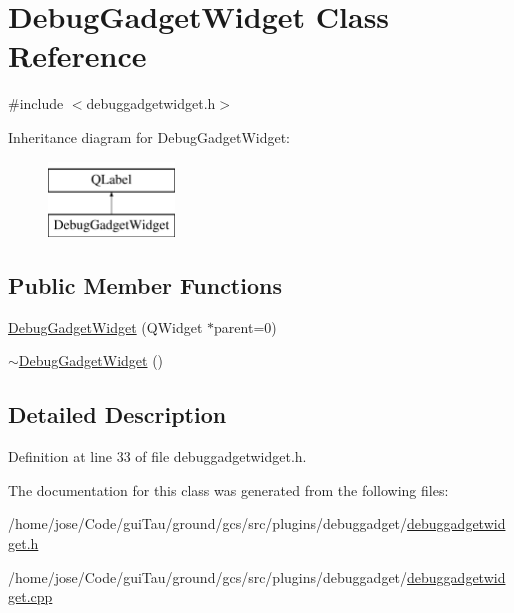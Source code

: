 \hypertarget{class_debug_gadget_widget}{\section{Debug\-Gadget\-Widget Class Reference}
\label{class_debug_gadget_widget}
}


{\ttfamily \#include $<$debuggadgetwidget.\-h$>$}

Inheritance diagram for Debug\-Gadget\-Widget\-:\begin{figure}[H]
\begin{center}
\leavevmode
\includegraphics[height=2.000000cm]{class_debug_gadget_widget}
\end{center}
\end{figure}
\subsection*{Public Member Functions}
\begin{DoxyCompactItemize}
\item 
\hyperlink{group___debug_gadget_plugin_ga67e29acbc33b5ca194215ea1c70e9e72}{Debug\-Gadget\-Widget} (Q\-Widget $\ast$parent=0)
\item 
\hyperlink{group___debug_gadget_plugin_ga74a70926720377a2a71c0946408b8127}{$\sim$\-Debug\-Gadget\-Widget} ()
\end{DoxyCompactItemize}


\subsection{Detailed Description}


Definition at line 33 of file debuggadgetwidget.\-h.



The documentation for this class was generated from the following files\-:\begin{DoxyCompactItemize}
\item 
/home/jose/\-Code/gui\-Tau/ground/gcs/src/plugins/debuggadget/\hyperlink{debuggadgetwidget_8h}{debuggadgetwidget.\-h}\item 
/home/jose/\-Code/gui\-Tau/ground/gcs/src/plugins/debuggadget/\hyperlink{debuggadgetwidget_8cpp}{debuggadgetwidget.\-cpp}\end{DoxyCompactItemize}
